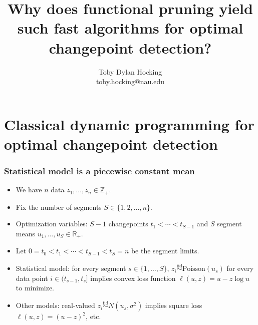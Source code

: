 \documentclass{beamer}
\newcommand{\RR}{\mathbb R}
\newcommand{\ZZ}{\mathbb Z}
\begin{document}
\title{Why does functional pruning yield such fast algorithms for
  optimal changepoint detection?}

\author{
  Toby Dylan Hocking\\
  toby.hocking@nau.edu
}


\maketitle

\section{Classical dynamic programming for optimal changepoint detection}

\begin{frame}
  \frametitle{Statistical model is a piecewise constant mean}

  
  \vskip -0.8cm    
  \begin{itemize}
  \item We have $n$ data $z_1, \dots, z_n\in\ZZ_+$.
  \item Fix the number of segments $S\in\{1, 2, \dots, n\}$.
  \item Optimization variables: $S-1$ changepoints
    $t_1 < \cdots < t_{S-1}$ and $S$ segment means $u_1,\dots,u_S\in\RR_+$.
  \item Let $0=t_0<t_1 < \cdots < t_{S-1}<t_S=n$ be the segment
    limits.
  \item Statistical model: for every segment $s\in\{1,\dots,S\}$,
    $z_i \stackrel{\text{iid}}{\sim} \text{Poisson}(u_s)$ for every
    data point $i\in(t_{s-1},t_s]$ implies convex loss function
    $\ell(u, z)=u-z\log u$ to minimize.
  \item Other models: real-valued
    $z_i\stackrel{\text{iid}}{\sim} N(u_s, \sigma^2)$ implies square
    loss $\ell(u, z)=(u-z)^2$, etc.
  \end{itemize}
\end{frame}
\end{document}
